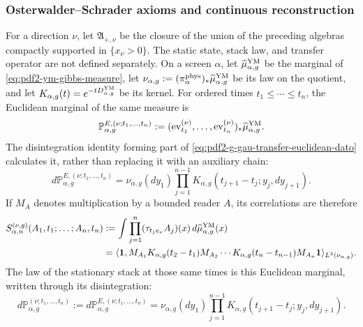 \subsubsection{Osterwalder--Schrader axioms and continuous reconstruction}

For a direction $\nu$, let $\mathfrak A_{+,\nu}$ be the closure of the union of
the preceding algebras compactly supported in $\{x_\nu>0\}$. The static
state, stack law, and transfer operator are not defined
separately. On a screen $\alpha$, let
$\widehat\mu_{\alpha,g}^{\rm YM}$ be the marginal of
\eqref{eq:pdf2-ym-gibbs-measure}, let
$\nu_{\alpha,g}:=(\pi_\alpha^{\rm phys})_*
\widehat\mu_{\alpha,g}^{\rm YM}$ be its law on the quotient, and let
$K_{\alpha,g}(t)=e^{-tD_{\alpha,g}^{\rm YM}}$ be its kernel.
For ordered times $t_1\le\cdots\le t_n$, the Euclidean marginal of the
same measure is
\begin{equation}\label{eq:pdf2-ym-owner-euclidean-time-marginal}
 \mathbb P_{\alpha,g}^{E,(\nu;t_1,\ldots,t_n)}
 :=(\operatorname{ev}_{t_1}^{(\nu)},\ldots,
    \operatorname{ev}_{t_n}^{(\nu)})_*
    \widehat\mu_{\alpha,g}^{\rm YM}.
\end{equation}
The disintegration identity forming part of
\eqref{eq:pdf2-g-gau-transfer-euclidean-dato} calculates it, rather than replacing it with
an auxiliary chain:
\begin{equation}\label{eq:pdf2-ym-owner-euclidean-markov-identification}
 d\mathbb P_{\alpha,g}^{E,(\nu;t_1,\ldots,t_n)}
 =\nu_{\alpha,g}(dy_1)
   \prod_{j=1}^{n-1}K_{\alpha,g}
      (t_{j+1}-t_j;y_j,dy_{j+1}).
\end{equation}
If $M_A$ denotes multiplication by a bounded reader $A$, its correlations
are therefore
\begin{equation}\label{eq:pdf2-ym-owner-schwinger-transfer}
 \begin{aligned}
 S_{\alpha,n}^{(\nu,g)}(A_1,t_1;\ldots;A_n,t_n)
 &:=\int\prod_{j=1}^n(\tau_{t_je_\nu}A_j)(x)\,
       d\widehat\mu_{\alpha,g}^{\rm YM}(x)\\
 &=\langle\mathbf1,
 M_{A_1}K_{\alpha,g}(t_2-t_1)M_{A_2}\cdots
 K_{\alpha,g}(t_n-t_{n-1})M_{A_n}\mathbf1
 \rangle_{L^2(\nu_{\alpha,g})}.
 \end{aligned}
\end{equation}
The law of the stationary stack at those same times is this Euclidean
marginal, written through its disintegration:
\begin{equation}\label{eq:pdf2-ym-owner-markov-stack-law}
 d\mathbb P_{\alpha,g}^{(\nu;t_1,\ldots,t_n)}
 :=d\mathbb P_{\alpha,g}^{E,(\nu;t_1,\ldots,t_n)}
 =\nu_{\alpha,g}(dy_1)
   \prod_{j=1}^{n-1}K_{\alpha,g}(t_{j+1}-t_j;y_j,dy_{j+1}).
\end{equation}
